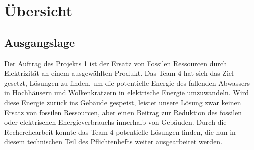 \section{Übersicht} \label{sec:uebersicht}
\subsection{Ausgangslage}
Der Auftrag des Projekts 1 ist der Ersatz von Fossilen Ressourcen durch Elektrizität an einem ausgewählten Produkt. Das Team 4 hat sich das Ziel gesetzt, Lösungen zu finden, um die potentielle Energie des fallenden Abwassers in Hochhäusern und Wolkenkratzern in elektrische Energie umzuwandeln. Wird diese Energie zurück ins Gebäude gespeist, leistet unsere Lösung zwar keinen Ersatz von fossilen Ressourcen, aber einen Beitrag zur Reduktion des fossilen oder elektrischen Energieverbrauchs innerhalb von Gebäuden.
Durch die Recherchearbeit konnte das Team 4 potentielle Lösungen finden, die nun in diesem technischen Teil des Pflichtenhefts weiter ausgearbeitet werden.
\renewcommand\arraystretch{2}
